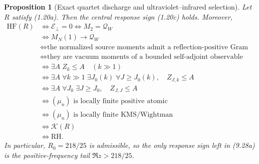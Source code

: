 \documentclass[11pt]{article}
\newtheorem{proposition}[theorem]{Proposition}
\begin{document}
\begin{proposition}[Exact quartet discharge and ultraviolet--infrared selection]
\label{prop:endpoint-frequency-master}
Let $R$ satisfy \textup{(1.20a)}.  Then the central response sign \textup{(1.20c)} holds.
Moreover,
\[
 \begin{aligned}
 \mathrm{HF}(R)
 &\Longleftrightarrow \mathcal E_\perp=0
 \Longleftrightarrow M_2=\mathcal Q_W\\
 &\Longleftrightarrow M_N(1)\longrightarrow\mathcal Q_W\\
 &\Longleftrightarrow
 \text{the normalized source moments admit a reflection-positive Gram orbit}\\
 &\Longleftrightarrow
 \text{they are vacuum moments of a bounded self-adjoint observable}\\
 &\Longleftrightarrow \exists A\; Z_k\le A\quad(k\gg1)\\
 &\Longleftrightarrow
 \exists A\;\forall k\gg1\;\exists J_0(k)\;\forall J\ge J_0(k),\quad Z_{J,k}\le A\\
 &\Longleftrightarrow
 \exists A\;\forall J_0\;\exists J\ge J_0,\quad Z_{J,J}\le A\\
 &\Longleftrightarrow(\mu_n)\text{ is locally finite positive atomic}\\
 &\Longleftrightarrow(\mu_n)\text{ is locally finite KMS/Wightman}\\
 &\Longleftrightarrow\mathcal K(R)\\
 &\Longleftrightarrow\mathrm{RH}.
 \end{aligned}
 \tag{9.28a}
\]
In particular, $R_0=218/25$ is admissible, so the only response sign left in
\textup{(9.28a)} is the positive-frequency tail $\Re z>218/25$.
\end{proposition}
\end{document}
